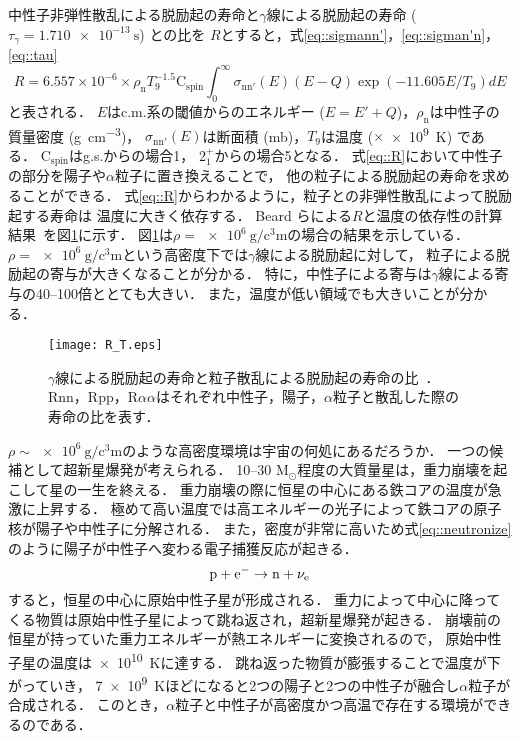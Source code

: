 \documentclass[../master]{subfiles}
\begin{document}
中性子非弾性散乱による脱励起の寿命と$\gamma$線による脱励起の寿命 ($\tau_{\gamma} = \SI{1.710e-13}{\second}$) との比を
$R$とすると，式\eqref{eq::sigmann'}，\eqref{eq::sigman'n}，\eqref{eq::tau}
\begin{equation}
  R = 6.557\times10^{-6}\times\rho_{\mathrm{n}}T_{9}^{-1.5}\mathrm{C}_{{\text{spin}}}
  \int^{\infty}_{0}\sigma_{\mathrm{nn}'}(E)(E-Q)\exp(-11.605E/T_{9})dE
  \label{eq::R}
\end{equation}
と表される．
$E$はc.m.系の閾値からのエネルギー ($E=E'+Q$)，$\rho_{\mathrm{n}}$は中性子の質量密度 (\si{\gram\per\cubic\centi\metre})，
$\sigma_{\mathrm{nn}'}(E)$は断面積 (\si{\milli\barn})，$T_{9}$は温度 ($\times$\SI{e9}{\kelvin}) である．
$\mathrm{C}_{{\text{spin}}}$はg.s.からの場合1，
$2_{1}^{+}$からの場合5となる．
式\eqref{eq::R}において中性子の部分を陽子や$\alpha$粒子に置き換えることで，
他の粒子による脱励起の寿命を求めることができる．
式\eqref{eq::R}からわかるように，粒子との非弾性散乱によって脱励起する寿命は
温度に大きく依存する．
Beard らによる$R$と温度の依存性の計算結果~\cite{hotdensemedium}を図\ref{fig::R}に示す．
図\ref{fig::R}は$\rho = \SI{e6}{\gram\per\cubic\centi\metre}$の場合の結果を示している．
$\rho = \SI{e6}{\gram\per\cubic\centi\metre}$という高密度下では$\gamma$線による脱励起に対して，
粒子による脱励起の寄与が大きくなることが分かる．
特に，中性子による寄与は$\gamma$線による寄与の40--100倍ととても大きい．
また，温度が低い領域でも大きいことが分かる．
\begin{figure}
  \centering
  \texttt{[image: R\_T.eps]}
  \caption[$\gamma$線による脱励起の寿命と粒子散乱による脱励起の寿命の比．]
          {$\gamma$線による脱励起の寿命と粒子散乱による脱励起の寿命の比~\cite{hotdensemedium}．
    Rnn，Rpp，R$\alpha\alpha$はそれぞれ中性子，陽子，$\alpha$粒子と散乱した際の寿命の比を表す．}
  \label{fig::R}
\end{figure}

$\rho\sim\SI{e6}{\gram\per\cubic\centi\metre}$のような高密度環境は宇宙の何処にあるだろうか．
一つの候補として超新星爆発が考えられる．
10--30 $\mathrm{M_{\odot}}$程度の大質量星は，重力崩壊を起こして星の一生を終える．
重力崩壊の際に恒星の中心にある鉄コアの温度が急激に上昇する．
極めて高い温度では高エネルギーの光子によって鉄コアの原子核が陽子や中性子に分解される．
また，密度が非常に高いため式\eqref{eq::neutronize}のように陽子が中性子へ変わる電子捕獲反応が起きる．
\begin{equation}
  {\rm p}+{\rm e}^{-} \rightarrow {\rm n}+\nu_{\rm e}
  \label{eq::neutronize}
\end{equation}
すると，恒星の中心に原始中性子星が形成される．
重力によって中心に降ってくる物質は原始中性子星によって跳ね返され，超新星爆発が起きる．
崩壊前の恒星が持っていた重力エネルギーが熱エネルギーに変換されるので，
原始中性子星の温度は\SI{e10}{\kelvin}に達する．
跳ね返った物質が膨張することで温度が下がっていき，
\SI{7e9}{\kelvin}ほどになると2つの陽子と2つの中性子が融合し$\alpha$粒子が合成される．
このとき，$\alpha$粒子と中性子が高密度かつ高温で存在する環境ができるのである．
\end{document}
